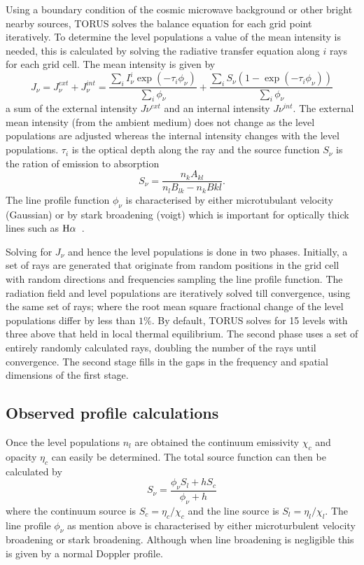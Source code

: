 \documentclass[fleqn,usenatbib]{mnras}
\begin{document}
Using a boundary condition of the cosmic microwave background or other bright nearby sources, TORUS solves the balance equation for each grid point iteratively. To determine the level populations a value of the mean intensity is needed, this is calculated by solving the radiative transfer equation along $i$ rays for each grid cell. The mean intensity is given by
\begin{equation}
    J_{\nu}=J_{\nu}^{ext}+J_{\nu}^{int}=\frac{\sum_{i}I_{\nu}^{i}\exp{\left(-\tau_{i}\phi_{\nu}\right)}}{\sum_{i}\phi_{\nu}}+\frac{\sum_{i}S_{\nu}\left(1-\exp{\left(-\tau_{i}\phi_{\nu}\right)}\right)}{\sum_{i}\phi_{\nu}}
    \label{eq:meanintensity}
\end{equation}
a sum of the external intensity $J{\nu}^{ext}$ and an internal intensity $J{\nu}^{int}$. The external mean intensity (from the ambient medium) does not change as the level populations are adjusted whereas the internal intensity changes with the level populations. $\tau_{i}$ is the optical depth along the ray and the source function $S_{\nu}$ is the ration of emission to absorption
\begin{equation}
    S_{\nu}=\frac{n_{k}A_{kl}}{n_{l}B_{lk}-n_{k}B{kl}}.
    \label{eq:sourcefunction}
\end{equation}
The line profile function $\phi_{\nu}$ is characterised by either microtubulant velocity (Gaussian) or by stark broadening (voigt) which is important for optically thick lines such as ${\rm H}\alpha$~\citep{Kurosawa:2011fh}.

Solving for $J_{\nu}$ and hence the level populations is done in two phases. Initially, a set of rays are generated that originate from random positions in the grid cell with random directions and frequencies sampling the line profile function. The radiation field and level populations are iteratively solved till convergence, using the same set of rays; where the root mean square fractional change of the level populations differ by less than $1\%$. By default, TORUS solves for 15 levels with three above that held in local thermal equilibrium. The second phase uses a set of entirely randomly calculated rays, doubling the number of the rays until convergence. The second stage fills in the gaps in the frequency and spatial dimensions of the first stage. 


\subsection{Observed profile calculations}
\label{sec:profilecalculations}
Once the level populations $n_{l}$ are obtained the continuum emissivity $\chi_c$ and opacity $\eta_c$ can easily be determined. The total source function can then be calculated by
\begin{equation}
    S_{\nu} = \frac{\phi_{\nu}S_l+hS_{c}}{\phi_{\nu}+h}
\end{equation}
where the continuum source is $S_{c}=\eta_{c}/\chi_{c}$ and the line source is $S_{l}=\eta_{l}/\chi_{l}$. The line profile $\phi_{\nu}$ as mention above is characterised by either microturbulent velocity broadening or stark broadening. Although when line broadening is negligible this is given by a normal Doppler profile.
\end{document}
